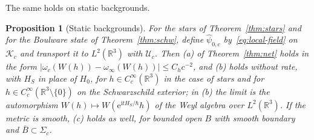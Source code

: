 \documentclass[%
 aip,
 jmp,
 amsmath,amssymb,
 reprint, onecolumn
]{revtex4-1}
\newtheorem{proposition}{Proposition}
\theoremstyle{definition}
\theoremstyle{remark}
\newcommand{\R}{\mathbb{R}}
\newcommand{\K}{\mathcal{K}}
\newcommand{\rmi}{\mathrm{i}}
\newcommand{\rme}{\mathrm{e}}
\begin{document}
The same holds on static backgrounds.

\begin{proposition}[Static backgrounds]\label{prop:net-static}
For the stars of Theorem~\ref{thm:stars} and for the Boulware state of
Theorem~\ref{thm:schw}, define $\hat\psi_{0,c}$ by~\eqref{eq:local-field}
on $\K_c$ and transport it to $L^2(\R^3)$ with $\mathcal{U}_c$. Then (a)
of Theorem~\ref{thm:net} holds in the form $|\omega_c(W(h))-
\omega_\infty(W(h))|\leq C_hc^{-2}$, and (b) holds without rate, with
$H_S$ in place of $H_0$, for $h\in C_c^\infty(\R^3)$ in the case of stars
and for $h\in C_c^\infty(\R^3\setminus\{0\})$ on the Schwarzschild
exterior; in (b) the limit is the automorphism $W(h)\mapsto W(\rme^{\rmi tH_S/\hbar}h)$
of the Weyl algebra over $L^2(\R^3)$. If the metric is smooth, (c) holds
as well, for bounded open $B$ with smooth boundary and $\bar B\subset
\Sigma_c$.
\end{proposition}
\end{document}
